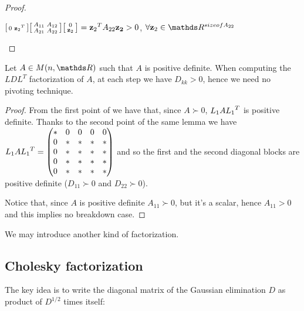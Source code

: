 \documentclass[ComputationalMathematics.tex]{subfiles}
\begin{document}
\begin{proof}
\begin{enumerate}
\begin{description}
      $\begin{bsmallmatrix}
        0& {\mathbf{z}_2}^{T}\\
      \end{bsmallmatrix}  
      \begin{bsmallmatrix}
	      A_{11} & A_{12}\\
	      A_{21} & A_{22}
      \end{bsmallmatrix} 
      \begin{bsmallmatrix}
        0\\\mathbf{z}_2
      \end{bsmallmatrix}
      = {\mathbf{z}_2}^{T} A_{22} \mathbf{z_2} > 0$, $\forall \mathbf{z}_2 \in \R^{size of A_{22}}$
 
  \end{description}
   \end{enumerate}
\end{proof}

\begin{corollary}
  Let $A \in M(n, \R)$ such that $A$ is positive definite. When computing the $LDL^T$ factorization of $A$, at each step we have $D_{kk}>0$, hence we need no pivoting technique.
\end{corollary}

\begin{proof}
  From the first point of  we have that, since $A {\succ} 0$, $L_1 A {L_1}^{T}$ is positive definite. Thanks to the second point of the same lemma we have $L_1 A {L_1}^{T} = 
\begin{pmatrix}
    \ast & 0 & 0 & 0 & 0\\
    0 & \ast & \ast & \ast & \ast\\
    0 & \ast & \ast & \ast & \ast\\
    0 & \ast & \ast & \ast & \ast\\
    0 & \ast & \ast & \ast & \ast\\
\end{pmatrix}$ and so the first and the second diagonal blocks are positive definite ($D_{11} {\succ} 0$ and $D_{22} {\succ} 0$).

  Notice that, since $A$ is positive definite $A_{11} {\succ} 0$, but it's a scalar, hence $A_{11} > 0$ and this implies no breakdown case.
\end{proof}

We may introduce another kind of factorization.

\subsection{Cholesky factorization}
The key idea is to write the diagonal matrix of the Gaussian elimination $D$ as product of $D^{1/2}$ times itself:
\end{document}
